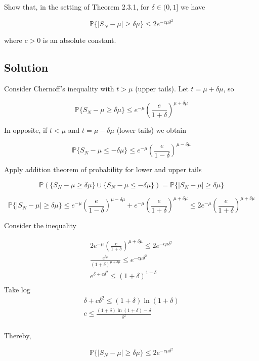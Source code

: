\documentclass{article}
\begin{document}
Show that, in the setting of Theorem 2.3.1, for $\delta \in (0, 1]$ we have

$$\mathbb P \{|S_N-\mu| \geq \delta\mu\} \leq 2e^{-c\mu\delta^2}$$

where $c > 0$ is an absolute constant.

\subsection{Solution}

Consider Chernoff’s inequality with $t>\mu$ (upper tails). Let $t = \mu+\delta\mu$, so

$$\mathbb P\{S_N - \mu \geq \delta\mu\} \leq e^{-\mu}\left(\frac{e}{1+\delta}\right)^{\mu+\delta\mu}$$

In opposite, if $t<\mu$ and $t = \mu-\delta\mu$ (lower tails) we obtain

$$\mathbb P\{S_N - \mu \leq -\delta\mu\} \leq e^{-\mu}\left(\frac{e}{1-\delta}\right)^{\mu-\delta\mu}$$

Apply addition theorem of probability for lower and upper tails

$$
\mathbb P \left( \{S_N - \mu \geq \delta\mu\} \cup \{S_N - \mu \leq -\delta\mu\}\right) = 
\mathbb P \{ |S_N - \mu|  \geq \delta\mu\}$$

$$\mathbb P \{ |S_N - \mu|  \geq \delta\mu\} \leq e^{-\mu}\left(\frac{e}{1-\delta}\right)^{\mu-\delta\mu} + e^{-\mu}\left(\frac{e}{1+\delta}\right)^{\mu+\delta\mu} \leq 2e^{-\mu}\left(\frac{e}{1+\delta}\right)^{\mu+\delta\mu}$$

Consider the inequality

$$
\begin{gathered}
    2e^{-\mu}\left(\frac{e}{1+\delta}\right)^{\mu+\delta\mu} \leq 2e^{-c\mu\delta^2} \\
    \frac{e^{\delta\mu}}{(1+\delta)^{\mu+\delta\mu}} \leq e^{-c\mu\delta^2} \\
    e^{\delta+c\delta^2} \leq (1+\delta)^{1+\delta} \\
\end{gathered}
$$
Take log
$$
\begin{gathered}
    \delta+c\delta^2 \leq (1+\delta)\ln (1+\delta) \\
    c \leq \frac{(1+\delta)\ln (1+\delta) - \delta}{\delta^2} \\
\end{gathered}
$$

Thereby,

$$\mathbb P \{|S_N-\mu| \geq \delta\mu\} \leq 2e^{-c\mu\delta^2}$$
\end{document}
